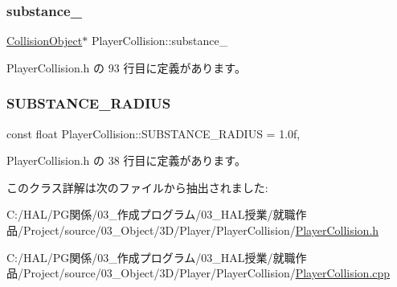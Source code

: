 \subsubsection{\texorpdfstring{substance\+\_\+}{substance\_}}
{\footnotesize\ttfamily \mbox{\hyperlink{class_collision_object}{Collision\+Object}}$\ast$ Player\+Collision\+::substance\+\_\+\hspace{0.3cm}{\ttfamily [private]}}



 Player\+Collision.\+h の 93 行目に定義があります。

\mbox{\label{class_player_collision_ab6bab4a28016089c86a90d3f77f46fdf}} 
\subsubsection{\texorpdfstring{S\+U\+B\+S\+T\+A\+N\+C\+E\+\_\+\+R\+A\+D\+I\+US}{SUBSTANCE\_RADIUS}}
{\footnotesize\ttfamily const float Player\+Collision\+::\+S\+U\+B\+S\+T\+A\+N\+C\+E\+\_\+\+R\+A\+D\+I\+US = 1.\+0f\hspace{0.3cm}{\ttfamily [static]}, {\ttfamily [private]}}



 Player\+Collision.\+h の 38 行目に定義があります。



このクラス詳解は次のファイルから抽出されました\+:\begin{DoxyCompactItemize}
\item 
C\+:/\+H\+A\+L/\+P\+G関係/03\+\_\+作成プログラム/03\+\_\+\+H\+A\+L授業/就職作品/\+Project/source/03\+\_\+\+Object/3\+D/\+Player/\+Player\+Collision/\mbox{\hyperlink{_player_collision_8h}{Player\+Collision.\+h}}\item 
C\+:/\+H\+A\+L/\+P\+G関係/03\+\_\+作成プログラム/03\+\_\+\+H\+A\+L授業/就職作品/\+Project/source/03\+\_\+\+Object/3\+D/\+Player/\+Player\+Collision/\mbox{\hyperlink{_player_collision_8cpp}{Player\+Collision.\+cpp}}\end{DoxyCompactItemize}
